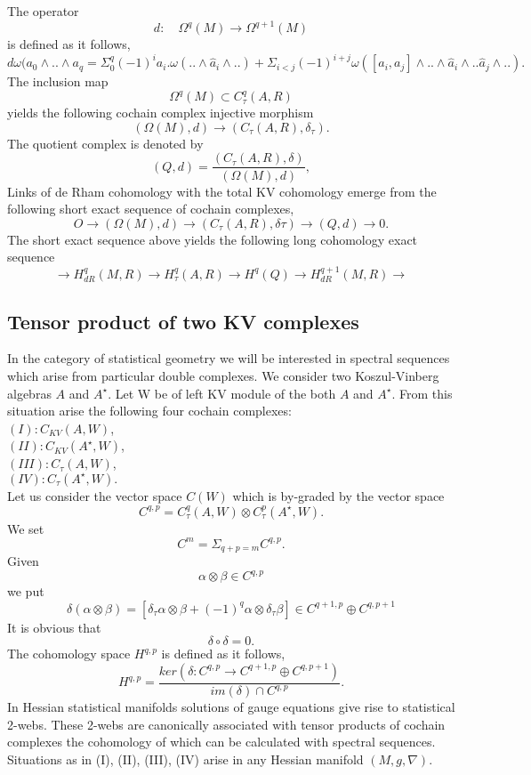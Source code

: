 The operator 
$$d:\quad \Omega^q(M)\rightarrow \Omega^{q+1}(M)$$
is defined as it follows,
$$d\omega (a_0 \wedge .. \wedge a_{q} = \Sigma^{q}_0 (-1)^i a_i.\omega(.. \wedge \hat{a}_i \wedge..) + \Sigma_{i < j}(-1)^{i+j}\omega ([a_i,a_j] \wedge.. \wedge \hat{a}_i \wedge.. \hat{a}_j \wedge..).$$
The inclusion map 
$$\Omega^q(M) \subset C^q_\tau(A,R)$$
yields the following cochain complex injective morphism
$$(\Omega(M),d) \rightarrow (C_\tau(A,R),\delta_\tau).$$
The quotient complex is denoted by
$$(Q,d) = \frac{(C_\tau(A,R),\delta)}{(\Omega(M),d)},$$
Links of de Rham cohomology with the total KV cohomology emerge from the following short exact sequence of cochain complexes,
$$O \rightarrow (\Omega(M),d)\rightarrow (C_\tau(A,R),\delta\tau)\rightarrow (Q,d)\rightarrow 0.$$ 
The short exact sequence above yields the following long cohomology exact sequence
$$\rightarrow H^q_{dR}(M,R) \rightarrow H^q_\tau(A,R)\rightarrow H^q(Q)\rightarrow H^{q+1}_{dR}(M,R)\rightarrow$$

\subsection{Tensor product of two KV complexes}
In the category of statistical geometry we will be interested in   spectral sequences which arise from particular double complexes.
We consider two Koszul-Vinberg algebras $A$ and $A^\star$. Let W be of left KV module of the both $A$ and $A^\star$. From this situation arise the following four cochain complexes:\\
$(I): C_{KV}(A,W)$,\\
$(II): C_{KV}(A^\star,W)$,\\
$(III): C_\tau(A,W)$,\\
$(IV): C_\tau(A^\star,W).$\\
Let us consider the vector space $C(W)$ which is by-graded by the vector space
$$ C^{q,p} = C^q_\tau(A,W) \otimes C^p_\tau(A^\star,W).$$
We set
$$C^m = \Sigma_{q+p = m} C^{q,p}.$$
Given $$\alpha \otimes \beta \in C^{q,p}$$
we put
$$\delta(\alpha\otimes\beta) = [ \delta_\tau \alpha\otimes \beta + (-1)^q\alpha \otimes \delta_\tau \beta] \in C^{q+1,p} \oplus C^{q,p+1}$$
It is obvious that 
$$\delta \circ \delta = 0.$$
The cohomology space $H^{q,p}$ is defined as it follows,
$$ H^{q,p}  = \frac{ker(\delta: C^{q,p}\rightarrow C^{q+1,p} \oplus C^{q,p+1})}{im(\delta)\cap C^{q,p}}.$$
In Hessian statistical manifolds solutions of gauge equations give rise to statistical 2-webs. These 2-webs are canonically associated with  tensor products of cochain complexes the cohomology of which can be calculated with spectral sequences.
Situations as in (I), (II), (III), (IV) arise in any Hessian manifold $(M,g,\nabla)$.
